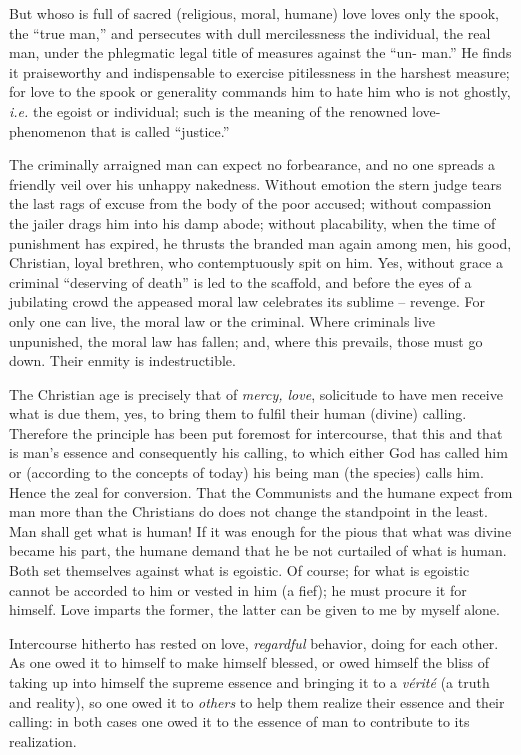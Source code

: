But whoso is full of sacred (religious, moral, humane) love loves only the 
spook, the ``true man,'' and persecutes with dull mercilessness the 
individual, the real man, under the phlegmatic legal title of measures against 
the ``un- man.'' He finds it praiseworthy and indispensable to exercise 
pitilessness in the harshest measure; for love to the spook or generality 
commands him to hate him who is not ghostly, \textit{i.e.} the egoist or 
individual; such is the meaning of the renowned love-phenomenon that is called 
``justice.''

The criminally arraigned man can expect no forbearance, and no one spreads a 
friendly veil over his unhappy nakedness. Without emotion the stern judge 
tears the last rags of excuse from the body of the poor accused; without 
compassion the jailer drags him into his damp abode; without placability, when 
the time of punishment has expired, he thrusts the branded man again among 
men, his good, Christian, loyal brethren, who contemptuously spit on him. Yes, 
without grace a criminal ``deserving of death'' is led to the scaffold, and 
before the eyes of a jubilating crowd the appeased moral law celebrates its 
sublime -- revenge. For only one can live, the moral law or the criminal. 
Where criminals live unpunished, the moral law has fallen; and, where this 
prevails, those must go down. Their enmity is indestructible.

The Christian age is precisely that of \textit{mercy, love}, solicitude to 
have men receive what is due them, yes, to bring them to fulfil their human 
(divine) calling. Therefore the principle has been put foremost for 
intercourse, that this and that is man's essence and consequently his calling, 
to which either God has called him or (according to the concepts of today) his 
being man (the species) calls him. Hence the zeal for conversion. That the 
Communists and the humane expect from man more than the Christians do does not 
change the standpoint in the least. Man shall get what is human! If it was 
enough for the pious that what was divine became his part, the humane demand 
that he be not curtailed of what is human. Both set themselves against what is 
egoistic. Of course; for what is egoistic cannot be accorded to him or vested 
in him (a fief); he must procure it for himself. Love imparts the former, the 
latter can be given to me by myself alone.

Intercourse hitherto has rested on love, \textit{regardful} behavior, doing 
for each other. As one owed it to himself to make himself blessed, or owed 
himself the bliss of taking up into himself the supreme essence and bringing 
it to a \textit{v\'erit\'e} (a truth and reality), so one owed it to 
\textit{others} to help them realize their essence and their calling: in both 
cases one owed it to the essence of man to contribute to its realization.

